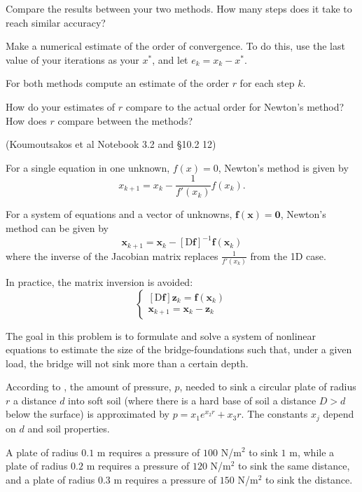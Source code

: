 \documentclass[12pt,letterpaper,noanswers]{exam}
\begin{document}
\begin{questions}
\begin{parts}
\item Compare the results between your two methods.  How many steps does it take to reach similar accuracy?

\item Make a numerical estimate of the order of convergence.  To do this, use the last value of your iterations as  your $x^*$, and let $e_k = x_k-x^*$.

For both methods compute an estimate of the order $r$ for each step $k$. 

\item How do your estimates of $r$ compare to the actual order for Newton's method?  How does $r$ compare between the methods?
\end{parts}
\item (Koumoutsakos et al Notebook 3.2 and \citep{burden2010numerical} \S10.2 12)

For a single equation in one unknown, $f(x) = 0$, Newton's method is given by \[x_{k+1} = x_k - \frac{1}{f'(x_k)}f(x_k).\]

For a system of equations and a vector of unknowns, $\mathbf{f}(\mathbf{x})= \mathbf{0}$, Newton's method can be given by
\[\mathbf{x}_{k+1} = \mathbf{x}_k - \left[\text{D}\mathbf{f}\right]^{-1}\mathbf{f}(\mathbf{x}_k)\] where the inverse of the Jacobian matrix replaces $\frac{1}{f'(x_k)}$ from the 1D case.

In practice, the matrix inversion is avoided:
\[\left\{\begin{array}{c}
\left[\text{D}\mathbf{f}\right]\mathbf{z}_k = \mathbf{f}(\mathbf{x}_k) \\
\mathbf{x}_{k+1} = \mathbf{x}_k - \mathbf{z}_k
\end{array}\right.\]

The goal in this problem is to formulate and solve a system of nonlinear equations to estimate the size of the bridge-foundations such that, under a given load, the bridge will not sink more than a certain depth.

According to \cite{burden2010numerical}, the amount of pressure, $p$, needed to sink a circular plate of radius $r$ a distance $d$ into soft soil (where there is a hard base of soil a distance $D>d$ below the surface) is approximated by $p = x_1 e^{x_2 r} + x_3 r$.  The constants $x_j$ depend on $d$ and soil properties.

\begin{parts}
\item 

A plate of radius $0.1$ m requires a pressure of $100$ N/m$^2$ to sink $1$ m, while a plate of radius $0.2$ m requires a pressure of $120$ N/m$^2$ to sink the same distance, and a plate of radius $0.3$ m requires a pressure of $150$ N/m$^2$ to sink the distance.


\end{parts}
\end{questions}
\end{document}
